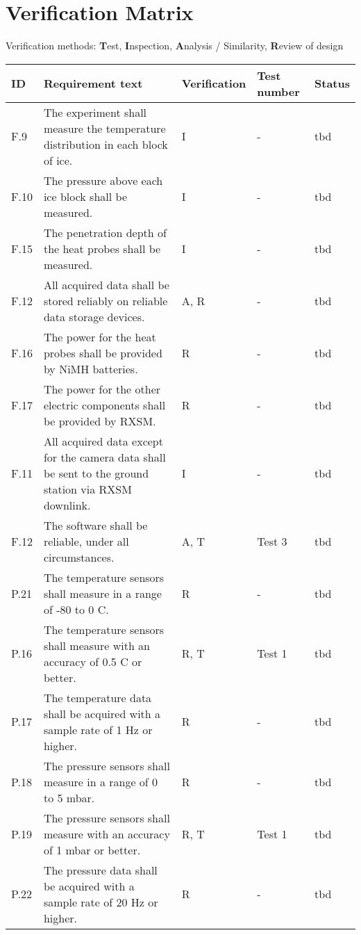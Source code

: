 \documentclass[11pt]{scrartcl}
\begin{document}
 \section{Verification Matrix}
 
 Verification methods: \textbf{T}est, \textbf{I}nspection, \textbf{A}nalysis / Similarity, \textbf{R}eview of design
 
 \begin{center}
	\begin{longtable}{| p{} | p{} | p{} | p{} | p{} |}
		\hline
		ID & Requirement text & Verification & Test number & Status \\
		\hline
		F.9 & The experiment shall measure the temperature distribution in each block of ice. & I & - & tbd \\
		F.10 & The pressure above each ice block shall be measured. & I & - & tbd \\
		F.15 & The penetration depth of the heat probes shall be measured. & I & - & tbd \\
		F.12 & All acquired data shall be stored reliably on reliable data storage devices. & A, R & - & tbd \\
		F.16 & The power for the heat probes shall be provided by NiMH batteries. & R & - & tbd \\
		F.17 & The power for the other electric components shall be provided by RXSM. & R & - & tbd \\
		F.11 & All acquired data except for the camera data shall be sent to the ground station via RXSM downlink. & I & - & tbd \\
		F.12 & The software shall be reliable, under all circumstances. & A, T & Test 3 & tbd \\
		\hline
		P.21 & The temperature sensors shall measure in a range of -80 to 0 \textdegree C. & R & - & tbd \\
		P.16 & The temperature sensors shall measure with an accuracy of 0.5 \textdegree C or better. & R, T & Test 1 & tbd \\
		P.17 & The temperature data shall be acquired with a sample rate of 1 Hz or higher. & R & - & tbd \\
		P.18 & The pressure sensors shall measure in a range of 0 to 5 mbar. & R & - & tbd \\
		P.19 & The pressure sensors shall measure with an accuracy of 1 mbar or better. & R, T & Test 1 & tbd \\
		P.22 & The pressure data shall be acquired with a sample rate of 20 Hz or higher\textsl{}. & R & - & tbd \\

\end{longtable}
\end{center}
\end{document}
